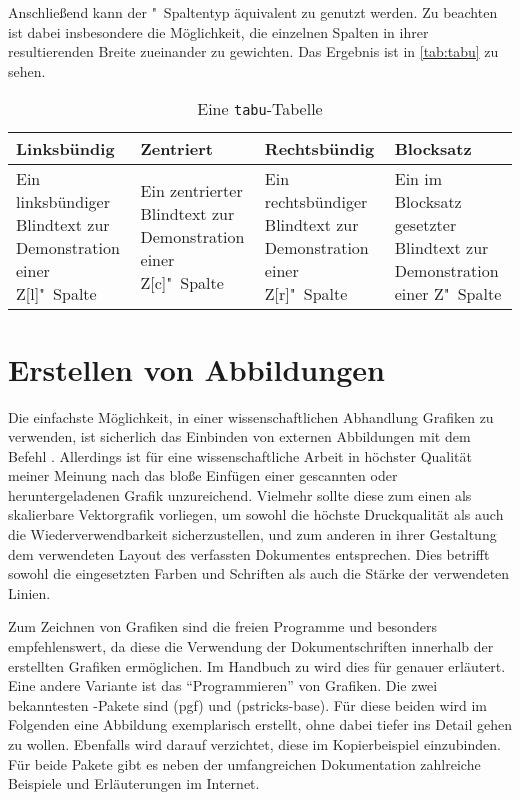 \documentclass[%
  english,ngerman,%
  geometry=no,DIV=12,automark,%
]{tudscrartcl}
\begin{document}
%
Anschließend kann der "~Spaltentyp äquivalent zu  genutzt 
werden. Zu beachten ist dabei insbesondere die Möglichkeit, die einzelnen 
Spalten in ihrer resultierenden Breite zueinander zu gewichten. Das Ergebnis 
ist in \autoref{tab:tabu} zu sehen.
%
\begin{Excerpt*}
\begin{table}
\caption{Eine \texttt{tabu}-Tabelle}\label{tab:tabu}
\begin{tabu} to 
\toprule
\textbf{Linksbündig} & \textbf{Zentriert} & 
\textbf{Rechtsbündig} & \textbf{Blocksatz} \tabularnewline
\midrule
Ein linksbündiger Blindtext zur Demonstration einer Z[l]"~Spalte &
Ein zentrierter Blindtext zur Demonstration einer Z[c]"~Spalte &
Ein rechtsbündiger Blindtext zur Demonstration einer Z[r]"~Spalte &
Ein im Blocksatz gesetzter Blindtext zur Demonstration einer Z"~Spalte
\tabularnewline
\bottomrule
\end{tabu}
\end{table}
\end{Excerpt*}
\InputExcerpt



\section{Erstellen von Abbildungen}
\label{sec:figures}
Die einfachste Möglichkeit, in einer wissenschaftlichen Abhandlung Grafiken zu 
verwenden, ist sicherlich das Einbinden von externen Abbildungen mit dem Befehl 
. Allerdings ist für eine wissenschaftliche Arbeit in 
höchster Qualität meiner Meinung nach das bloße Einfügen einer gescannten oder 
heruntergeladenen Grafik unzureichend. Vielmehr sollte diese zum einen als 
skalierbare Vektorgrafik vorliegen, um sowohl die höchste Druckqualität als 
auch die Wiederverwendbarkeit sicherzustellen, und zum anderen in ihrer 
Gestaltung dem verwendeten Layout des verfassten Dokumentes entsprechen. Dies 
betrifft sowohl die eingesetzten Farben und Schriften als auch die Stärke der 
verwendeten Linien.

Zum Zeichnen von Grafiken sind die freien Programme  und 
besonders  empfehlenswert, da diese die Verwendung der 
Dokumentschriften innerhalb der erstellten Grafiken ermöglichen. Im Handbuch zu 
\TUDScript wird dies für  
genauer erläutert. Eine andere Variante ist das \enquote{Programmieren} von 
Grafiken. Die zwei bekanntesten -Pakete sind (pgf) 
und (pstricks-base). Für diese beiden wird im Folgenden eine 
Abbildung exemplarisch erstellt, ohne dabei tiefer ins Detail gehen zu wollen. 
Ebenfalls wird darauf verzichtet, diese im Kopierbeispiel einzubinden. Für 
beide Pakete gibt es neben der umfangreichen Dokumentation zahlreiche Beispiele 
und Erläuterungen im Internet.
\end{document}
